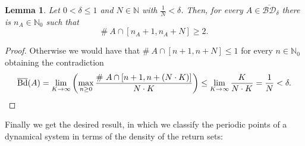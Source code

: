 \documentclass[openright,11pt]{article}
\theoremstyle{plain}
\newtheorem{lemma}[theorem]{Lemma}
\theoremstyle{definition}
\newcommand{\NN}{\mathbb{N}}
\newcommand{\del}{\delta}
\newcommand{\Bdsup}{\overline{\operatorname{Bd}}}
\newcommand{\BDsup}{\overline{\mathcal{BD}}}
\begin{document}
\begin{lemma}\label{Lem:BDsup-consecutive}
	Let $0<\del\leq 1$ and $N \in \NN$ with $\frac{1}{N}<\del$. Then, for every $A \in \BDsup_{\del}$ there is $n_A \in \NN_0$ such that
	\begin{equation*}
		\# \ A\cap [n_A+1,n_A+N]\geq 2.
	\end{equation*}
\end{lemma}
\begin{proof}
	Otherwise we would have that $\# \ A\cap [n+1,n+N] \leq 1$ for every $n \in \NN_0$ obtaining the contradiction
	\begin{equation*}
		\Bdsup(A) = \lim_{K \to \infty} \left( \max_{n \geq 0} \dfrac{\# \ A\cap [n+1,n+(N\cdot K)]}{N\cdot K} \right) \leq \lim_{K \to \infty} \dfrac{K}{N\cdot K} = \frac{1}{N} < \del.\qedhere
	\end{equation*}
\end{proof}

Finally we get the desired result, in which we classify the periodic points of a dynamical system in terms of the density of the return sets:
\end{document}
